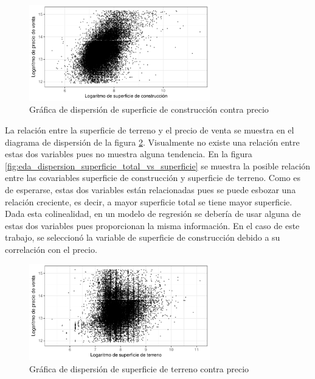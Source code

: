 \begin{figure}[H]
    \centering
    \includegraphics[width=0.7\textwidth]{images/eda_dispersion_superficie_vs_precio.pdf}
    \caption{Gráfica de dispersión de superficie de construcción contra precio}
    \label{fig:eda_dispersion_superficie_vs_precio}
\end{figure}


La relación entre la superficie de terreno y el precio de venta se muestra en el diagrama de dispersión de la figura \ref{fig:eda_dispersion_superficie_total_vs_precio}. Visualmente no existe una relación entre estas dos variables pues no muestra alguna tendencia. En la figura \ref{fig:eda_dispersion_superficie_total_vs_superficie} se muestra la posible relación entre las covariables superficie de construcción y superficie de terreno. Como es de esperarse, estas dos variables están relacionadas pues se puede esbozar una relación creciente, es decir, a mayor superficie total se tiene mayor superficie. Dada esta colinealidad, en un modelo de regresión se debería de usar alguna de estas dos variables pues proporcionan la misma información. En el caso de este trabajo, se seleccionó la variable de superficie de construcción debido a su correlación con el precio.


\begin{figure}[H]
    \centering
    \includegraphics[width=0.7\textwidth]{images/eda_dispersion_superficie_total_vs_precio.pdf}
    \caption{Gráfica de dispersión de superficie de terreno contra precio}
    \label{fig:eda_dispersion_superficie_total_vs_precio}
\end{figure}



